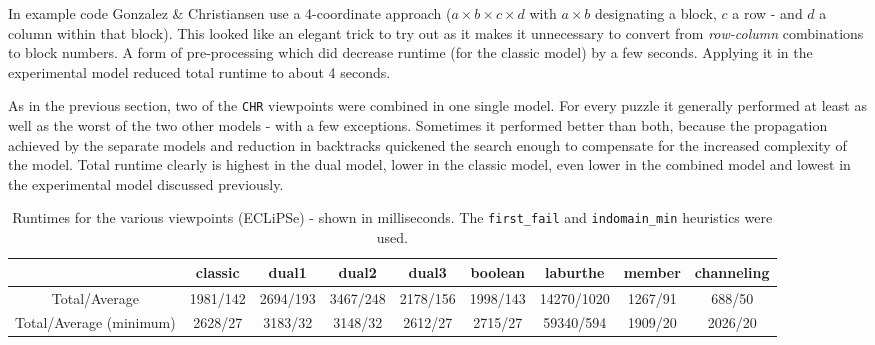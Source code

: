 In example code Gonzalez \& Christiansen use a 4-coordinate approach ($a\times b\times c\times d$ with $a\times b$ designating a block, $c$ a row - and $d$ a column within that block). This looked like an elegant trick to try out as it makes it unnecessary to convert from \textit{row-column} combinations to block numbers. A form of pre-processing which did decrease runtime (for the classic model) by a few seconds. Applying it in the experimental model reduced total runtime to about 4 seconds.\\\par

As in the previous section, two of the \texttt{CHR} viewpoints were combined in one single model. For every puzzle it generally performed at least as well as the worst of the two other models - with a few exceptions. Sometimes it performed better than both, because the propagation achieved by the separate models and reduction in backtracks quickened the search enough to compensate for the increased complexity of the model. Total runtime clearly is highest in the dual model, lower in the classic model, even lower in the combined model and lowest in the experimental model discussed previously.

\newpage
\begin{table}[h]
\footnotesize
\bgroup
\def\arraystretch{1.3}
\begin{tabular}{ccccccccc}
\multicolumn{1}{l}{} & classic & dual1 & dual2 & dual3 & boolean & laburthe & member & channeling \\ \hline
Total/Average & 1981/142 & 2694/193 & 3467/248 & 2178/156 & 1998/143 & 14270/1020 & 1267/91 & 688/50 \\
Total/Average (minimum) & 2628/27 & 3183/32 & 3148/32 & 2612/27 & 2715/27 & 59340/594 & 1909/20 & 2026/20
\end{tabular}
\egroup
\caption{Runtimes for the various viewpoints (ECLiPSe) - shown in milliseconds. The \texttt{first\_fail} and \texttt{indomain\_min} heuristics were used.}
\label{tab:res1}
\end{table}


